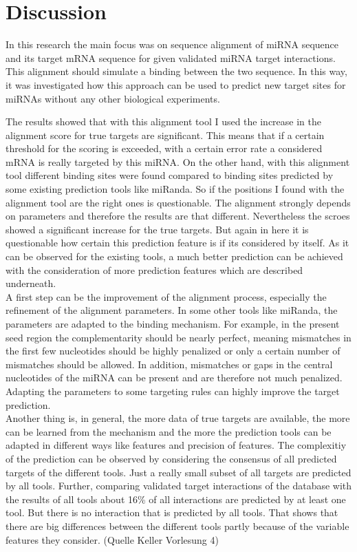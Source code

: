 \documentclass[12pt]{article}
\begin{document}
\section{Discussion}

In this research the main focus was on sequence alignment of miRNA sequence and its target mRNA sequence for given validated miRNA target interactions. This alignment should simulate a binding between the two sequence. In this way, it was investigated how this approach can be used to predict new target sites for miRNAs without any other biological experiments. 

The results showed that with this alignment tool I used the increase in the alignment score for true targets are significant. This means that if a certain threshold for the scoring is exceeded, with a certain error rate a considered mRNA is really targeted by this miRNA. On the other hand, with this alignment tool different binding sites were found compared to binding sites predicted by some existing prediction tools like miRanda. So if the positions I found with the alignment tool are the right ones is questionable. The alignment strongly depends on parameters and therefore the results are that different. Nevertheless the scroes showed a significant increase for the true targets. But again in here it is questionable how certain this prediction feature is if its considered by itself. As it can be observed for the existing tools, a much better prediction can be achieved with the consideration of more prediction features which are described underneath.\\

A first step can be the improvement of the alignment process, especially the refinement of the alignment parameters. In some other tools like miRanda, the parameters are adapted to the binding mechanism. For example, in the present seed region the complementarity should be nearly perfect, meaning mismatches in the first few nucleotides should be highly penalized or only a certain number of mismatches should be allowed. In addition, mismatches or gaps in the central nucleotides of the miRNA can be present and are therefore not much penalized. Adapting the parameters to some targeting rules can highly improve the target prediction. \\

Another thing is, in general, the more data of true targets are available, the more can be learned from the mechanism and the more the prediction tools can be adapted in different ways like features and precision of features.
The complexitiy of the prediction can be observed by considering the consensus of all predicted targets of the different tools. Just a really small subset of all targets are predicted by all tools. Further, comparing validated target interactions of the database with the results of all tools about 16\% of all interactions are predicted by at least one tool. But there is no interaction that is predicted by all tools. That shows that there are big differences between the different tools partly because of the variable features they consider. (Quelle Keller Vorlesung 4) \\\\
\end{document}
